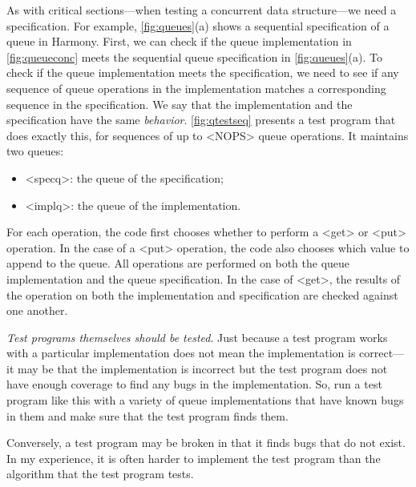 \documentclass{report}
\begin{document}

As with critical sections---when testing a concurrent data structure---we
need a specification.
For example, \autoref{fig:queues}(a) shows a sequential specification of a
queue in Harmony.
First, we can check if the queue implementation
in \autoref{fig:queueconc} meets the sequential
queue specification in \autoref{fig:queues}(a).
To check if the queue implementation meets the specification,
we need to see if any sequence of queue operations in the
implementation matches a corresponding sequence in the
specification.
We say that the implementation and the specification
have the same \emph{behavior}.
%
\autoref{fig:qtestseq} presents a test program that does
exactly this, for sequences of up to <{NOPS}>
queue operations.
It maintains two queues:
\begin{itemize}
\item[] <{specq}>: the queue of the specification;
\item[] <{implq}>: the queue of the implementation.
\end{itemize}
For each operation, the code first chooses whether to
perform a <{get}> or <{put}> operation.
In the case of a <{put}> operation, the code also
chooses which value to append to the queue.
All operations are performed on both the queue implementation
and the queue specification.
In the case of <{get}>, the results of the operation
on both the implementation and specification are checked against one another.

\emph{Test programs themselves should be tested}.
Just because a test program works with a particular implementation
does not mean the implementation is correct---it may be that the implementation
is incorrect but the test program does not have enough coverage to find any
bugs in the implementation.
So, run a test program like this with a variety of queue implementations that
have known bugs in them and make sure that the test program finds them.

Conversely, a test program may be broken in that it finds bugs that do not exist.
In my experience, it is often harder to implement the test program than
the algorithm that the test program tests.
\end{document}
